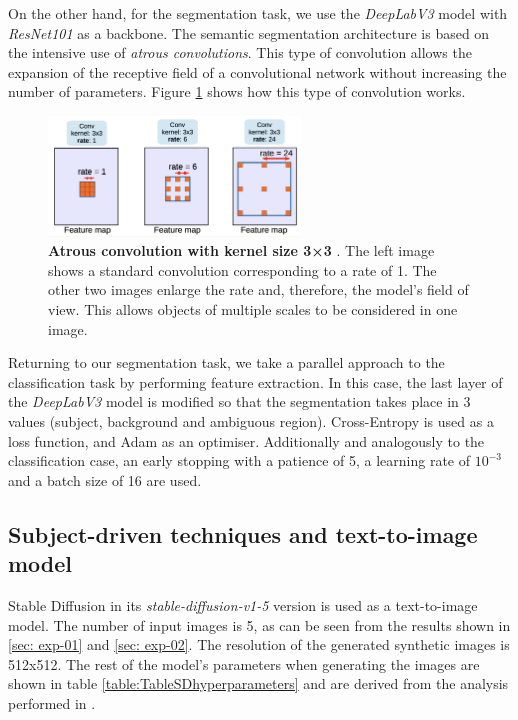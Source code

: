 On the other hand, for the segmentation task, we use the \textit{DeepLabV3} model \cite{chen2017rethinking} with \textit{ResNet101} as a backbone. The semantic segmentation architecture is based on the intensive use of \textit{atrous convolutions}. This type of convolution allows the expansion of the receptive field of a convolutional network without increasing the number of parameters. Figure \ref{fig:atrous} shows how this type of convolution works.

\begin{figure}
    \centering
    \includegraphics[width=0.6\textwidth]{Pictures/atrous.png} 
    \caption{\textbf{Atrous convolution with kernel size 3×3} \cite{chen2017rethinking}. The left image shows a standard convolution corresponding to a rate of 1. The other two images enlarge the rate and, therefore, the model's field of view. This allows objects of multiple scales to be considered in one image.}
    \label{fig:atrous}
\end{figure}

Returning to our segmentation task, we take a parallel approach to the classification task by performing feature extraction. In this case, the last layer of the \textit{DeepLabV3} model is modified so that the segmentation takes place in 3 values (subject, background and ambiguous region). Cross-Entropy is used as a loss function, and Adam as an optimiser. Additionally and analogously to the classification case, an early stopping with a patience of 5, a learning rate of $10^{-3}$ and a batch size of 16 are used.

\subsection{Subject-driven techniques and text-to-image model}

Stable Diffusion in its \textit{stable-diffusion-v1-5} version is used as a text-to-image model. The number of input images is 5, as can be seen from the results shown in \ref{sec: exp-01} and \ref{sec: exp-02}. The resolution of the generated synthetic images is 512x512. The rest of the model's parameters when generating the images are shown in table \ref{table:TableSDhyperparameters} and are derived from the analysis performed in \cite{stablediffusiondiffusers}.


